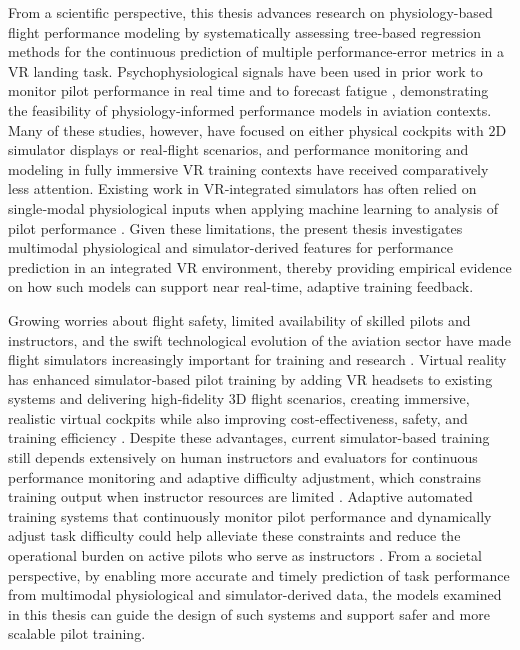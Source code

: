 \documentclass[11pt, a4paper]{article}
\begin{document}
From a scientific perspective, this thesis advances research on physiology-based flight performance modeling by systematically assessing tree‑based regression methods for the continuous prediction of multiple performance-error metrics in a VR landing task. Psychophysiological signals have been used in prior work to monitor pilot performance in real time and to forecast fatigue \cite{alreshidi-2024,dideriksen-2019,wilson-2019}, demonstrating the feasibility of physiology‑informed performance models in aviation contexts. Many of these studies, however, have focused on either physical cockpits with $2$D simulator displays or real‑flight scenarios, and performance monitoring and modeling in fully immersive VR training contexts have received comparatively less attention. Existing work in VR‑integrated simulators has often relied on single‑modal physiological inputs when applying machine learning to analysis of pilot performance \cite{moore-2023,rajendran-2021}. Given these limitations, the present thesis investigates multimodal physiological and simulator-derived features for performance prediction in an integrated VR environment, thereby providing empirical evidence on how such models can support near real-time, adaptive training feedback.

Growing worries about flight safety, limited availability of skilled pilots and instructors, and the swift technological evolution of the aviation sector have made flight simulators increasingly important for training and research \cite{wang-2024}. Virtual reality has enhanced simulator‑based pilot training by adding VR headsets to existing systems and delivering high‑fidelity $3$D flight scenarios, creating immersive, realistic virtual cockpits while also improving cost‑effectiveness, safety, and training efficiency \cite{wang-2024}. Despite these advantages, current simulator-based training still depends extensively on human instructors and evaluators for continuous performance monitoring and adaptive difficulty adjustment, which constrains training output when instructor resources are limited \cite{caballero-2023}. Adaptive automated training systems that continuously monitor pilot performance and dynamically adjust task difficulty could help alleviate these constraints and reduce the operational burden on active pilots who serve as instructors \cite{barry-2025}. From a societal perspective, by enabling more accurate and timely prediction of task performance from multimodal physiological and simulator-derived data, the models examined in this thesis can guide the design of such systems and support safer and more scalable pilot training.
\end{document}
